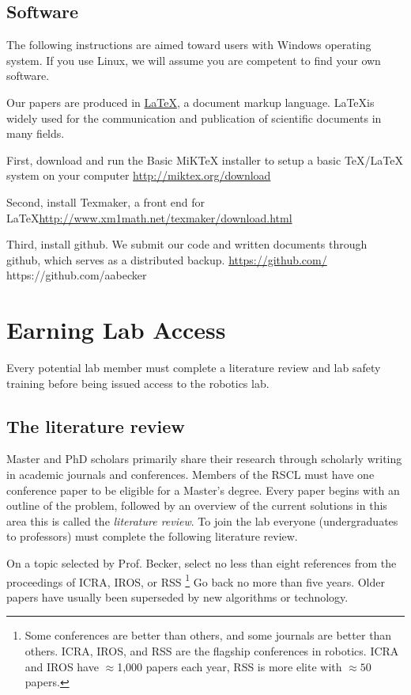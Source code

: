 \documentclass[letterpaper, 10 pt, conference]{ieeeconf}
\begin{document}
\subsection{Software}
The following instructions are aimed toward users with Windows operating system. If you use Linux, we will assume you are competent to find your own software.

Our papers are produced in \href{http://en.wikipedia.org/wiki/LaTeX}{\LaTeX}, a document markup language. \LaTeX is widely used for the communication and publication of scientific documents in many fields.

First, download and run the Basic MiKTeX installer to setup a basic TeX/LaTeX system on your computer \url{http://miktex.org/download}

Second, install Texmaker, a front end for \LaTeX \url{http://www.xm1math.net/texmaker/download.html}

Third, install github. We submit our code and written documents through github, which serves as a distributed backup. 
\url{https://github.com/}
https://github.com/aabecker





 
\section{Earning Lab Access}
Every potential lab member must complete a literature review and lab safety training before being issued access to the robotics lab.

\subsection{The literature review}
Master and PhD scholars primarily share their research through scholarly writing in academic journals and conferences. Members of the RSCL must have one conference paper to be eligible for a Master's degree. Every paper begins with an outline of the problem, followed by an overview of the current solutions in this area this is called the \emph{literature review}. To join the lab everyone (undergraduates to professors) must complete the following literature review.

On a topic selected by Prof. Becker, select no less than eight references from the proceedings of ICRA, IROS, or RSS \footnote{Some conferences are better than others, and some journals are better than others. ICRA, IROS, and RSS are the flagship conferences in robotics.  ICRA and IROS have $\approx$1,000 papers each year, RSS is more elite with $\approx50$ papers.} Go back no more than five years.  Older papers have usually been superseded by new algorithms or technology.
\end{document}
